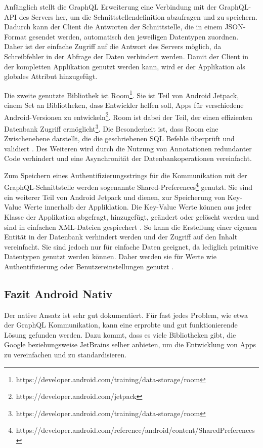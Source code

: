 Anfänglich stellt die GraphQL Erweiterung eine Verbindung mit der GraphQL-API des Servers her, um die Schnittstellendefinition abzufragen und zu speichern. Dadurch kann der Client die Antworten der Schnittstelle, die in einem JSON-Format gesendet werden, automatisch den jeweiligen Datentypen zuordnen. Daher ist der einfache Zugriff auf die Antwort des Servers möglich, da Schreibfehler in der Abfrage der Daten verhindert werden.
Damit der Client in der kompletten Applikation genutzt werden kann, wird er der Applikation als globales Attribut hinzugefügt.

Die zweite genutzte Bibliothek ist Room\footnote{https://developer.android.com/training/data-storage/room}. Sie ist Teil von Android Jetpack, einem Set an Bibliotheken, dass Entwickler helfen soll, Apps für verschiedene Android-Versionen zu entwickeln\footnote{https://developer.android.com/jetpack}. Room ist dabei der Teil, der einen effizienten Datenbank Zugriff ermöglicht\footnote{https://developer.android.com/training/data-storage/room}.
Die Besonderheit ist, dass Room eine Zwischenebene darstellt, die die geschriebenen SQL Befehle überprüft und validiert \cite{Android_Room}. Des Weiteren wird durch die Nutzung von Annotationen redundanter Code verhindert und eine Asynchronität der Datenbankoperationen vereinfacht.

Zum Speichern eines Authentifizierungsstrings für die Kommunikation mit der GraphQL-Schnittstelle werden sogenannte Shared-Preferences\footnote{https://developer.android.com/reference/android/content/SharedPreferences} genutzt. 
Sie sind ein weiterer Teil von Android Jetpack und dienen, zur Speicherung von Key-Value Werte innerhalb der Appliklation. 
Die Key-Value Werte können aus jeder Klasse der Applikation abgefragt, hinzugefügt, geändert oder gelöscht werden und sind in einfachen XML-Dateien gespiechert \cite{Shared_Preferences_Android}. 
So kann die Erstellung einer eigenen Entität in der Datenbank verhindert werden und der Zugriff auf den Inhalt vereinfacht. 
Sie sind jedoch nur für einfache Daten geeignet, da lediglich primitive Datentypen genutzt werden können. 
Daher werden sie für Werte wie Authentifizierung oder Benutzereinstellungen genutzt \cite{Shared_Preferences_Android}.


\subsection{Fazit Android Nativ}
Der native Ansatz ist sehr gut dokumentiert. Für fast jedes Problem, wie etwa der GraphQL Kommunikation, kann eine erprobte und gut funktionierende Lösung gefunden werden. Dazu kommt, dass es viele Bibliotheken gibt, die Google beziehungsweise JetBrains selber anbieten, um die Entwicklung von Apps zu vereinfachen und zu standardisieren.

